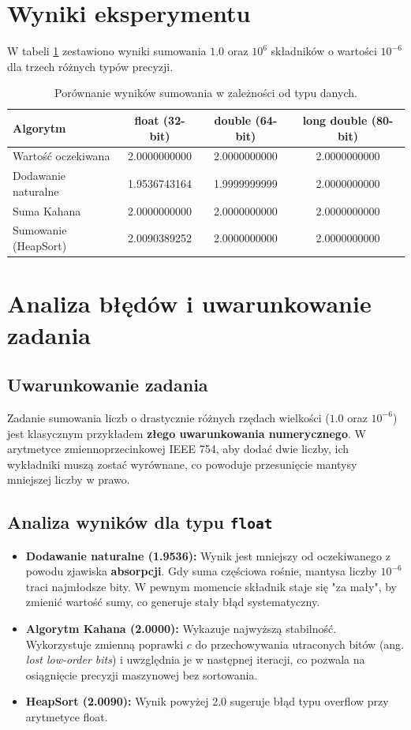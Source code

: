 \documentclass{article}
\begin{document}
\section{Wyniki eksperymentu}

W tabeli \ref{tabela-wyniki} zestawiono wyniki sumowania $1.0$ oraz $10^6$ składników o wartości $10^{-6}$ dla trzech różnych typów precyzji.

\begin{table}[h!]
\centering
\begin{tabular}{@{}lccc@{}}
\toprule
\textbf{Algorytm} & \textbf{float} (32-bit) & \textbf{double} (64-bit) & \textbf{long double} (80-bit) \\ \midrule
Wartość oczekiwana & 2.0000000000 & 2.0000000000 & 2.0000000000 \\ \midrule
Dodawanie naturalne & 1.9536743164 & 1.9999999999 & 2.0000000000 \\
Suma Kahana & 2.0000000000 & 2.0000000000 & 2.0000000000 \\
Sumowanie (HeapSort) & 2.0090389252 & 2.0000000000 & 2.0000000000 \\ \bottomrule
\end{tabular}
\caption{Porównanie wyników sumowania w zależności od typu danych.}
\label{tabela-wyniki}
\end{table}

\section{Analiza błędów i uwarunkowanie zadania}

\subsection{Uwarunkowanie zadania}
Zadanie sumowania liczb o drastycznie różnych rzędach wielkości ($1.0$ oraz $10^{-6}$) jest klasycznym przykładem \textbf{złego uwarunkowania numerycznego}. W arytmetyce zmiennoprzecinkowej IEEE 754, aby dodać dwie liczby, ich wykładniki muszą zostać wyrównane, co powoduje przesunięcie mantysy mniejszej liczby w prawo.

\subsection{Analiza wyników dla typu \texttt{float}}
\begin{itemize}
    \item \textbf{Dodawanie naturalne (1.9536):} Wynik jest mniejszy od oczekiwanego z powodu zjawiska \textbf{absorpcji}. Gdy suma częściowa rośnie, mantysa liczby $10^{-6}$ traci najmłodsze bity. W pewnym momencie składnik staje się "za mały", by zmienić wartość sumy, co generuje stały błąd systematyczny.
    \item \textbf{Algorytm Kahana (2.0000):} Wykazuje najwyższą stabilność. Wykorzystuje zmienną poprawki $c$ do przechowywania utraconych bitów (ang. \textit{lost low-order bits}) i uwzględnia je w następnej iteracji, co pozwala na osiągnięcie precyzji maszynowej bez sortowania.
    \item \textbf{HeapSort (2.0090):} Wynik powyżej 2.0 sugeruje błąd typu overflow przy arytmetyce float.
\end{itemize}
\end{document}
